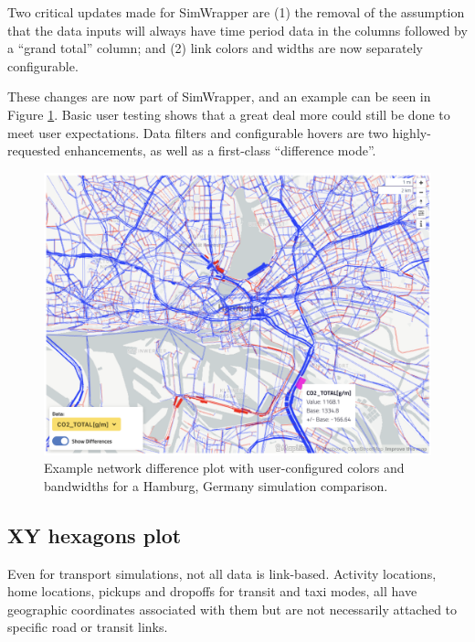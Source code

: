 Two critical updates made for SimWrapper are (1) the removal of the assumption that the data inputs will always have time period data in the columns followed by a ``grand total'' column; and (2) link colors and widths are now separately configurable.

These changes are now part of SimWrapper, and an example can be seen in Figure \ref{fig:simwrapper-network-links}. Basic user testing shows that a great deal more could still be done to meet user expectations. Data filters and configurable hovers are two highly-requested enhancements, as well as a first-class ``difference mode''.

\begin{figure}[ht]
  \centering
  \includegraphics[width=0.7\linewidth]{chapters/31-simwrapper/images/network-links.png}
  \caption{Example network difference plot with user-configured colors and bandwidths for a Hamburg, Germany simulation comparison. }
  \label{fig:simwrapper-network-links}
\end{figure}


\hypertarget{simwrapper-xy-hexagon-plots}{%
\subsection{XY hexagons plot}\label{simwrapper-xy-hexagon-plots}}

Even for transport simulations, not all data is link-based. Activity locations, home locations, pickups and dropoffs for transit and taxi modes, all have geographic coordinates associated with them but are not necessarily attached to specific road or transit links.

